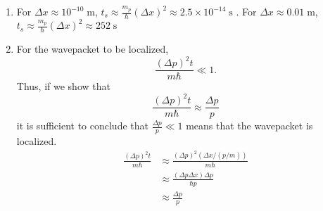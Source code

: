 \begin{sol}
\begin{enumerate}[label=\textbf{(\alph*)}]
\item For $\Delta x \approx 10^{-10}\;\mathrm{m}$,  $t_s \approx \frac{m_p}{\hbar}(\Delta x)^2 \approx 2.5 \times 10^{-14}\;\mathrm{s}$ . For $\Delta x \approx 0.01\;\mathrm{m}$, $t_s \approx \frac{m_p}{\hbar}(\Delta x)^2 \approx 252\;\mathrm{s}$
\item For the wavepacket to be localized, $$\frac{(\Delta p)^2t}{m\hbar} \ll 1.$$ Thus, if we show that $$\frac{(\Delta p)^2t}{m\hbar} \approx \frac{\Delta p}{p}$$it is sufficient to conclude that $\frac{\Delta p}{p} \ll 1$ means that the wavepacket is localized. 
\begin{align*}
\frac{(\Delta p)^2t}{m\hbar} &\approx \frac{(\Delta p)^2(\Delta x/(p/m))}{m\hbar}\\ &\approx \frac{(\Delta p\Delta x)\Delta p}{\hbar p}\\ &\approx \frac{\Delta p}{p}
\end{align*}
\end{enumerate}
\end{sol}
